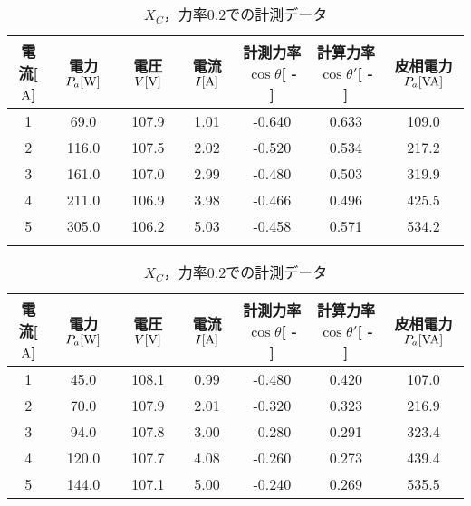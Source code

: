 \begin{table}[h]
	\caption{$X_{C}$，力率$0.4$での計測データ}
	\label{tab:0.4data2}
\begin{tabular}{ccccccc}
	\hline
	電流[$\rm{A}$] & 電力$P_a[\rm{W}]$ & 電圧$V[\rm{V}]$ & 電流$I[\rm{A}]$ & 計測力率$\cos \theta$[ - ] & 計算力率$\cos \theta '$[ - ] & 皮相電力$P_a[\rm{VA}]$ \\ \hline
	1 & 69.0  & 107.9 & 1.01 & -0.640 & 0.633 & 109.0 \\
	2 & 116.0 & 107.5 & 2.02 & -0.520 & 0.534 & 217.2 \\
	3 & 161.0 & 107.0 & 2.99 & -0.480 & 0.503 & 319.9 \\
	4 & 211.0 & 106.9 & 3.98 & -0.466 & 0.496 & 425.5 \\
	5 & 305.0 & 106.2 & 5.03 & -0.458 & 0.571 & 534.2 \\ \hline\\
\end{tabular}
	\caption{$X_{C}$，力率$0.2$での計測データ}
	\label{tab:0.2data2}
\begin{tabular}{ccccccc}
\hline
電流[$\rm{A}$] & 電力$P_a[\rm{W}]$ & 電圧$V[\rm{V}]$ & 電流$I[\rm{A}]$ & 計測力率$\cos \theta$[ - ] & 計算力率$\cos \theta '$[ - ] & 皮相電力$P_a[\rm{VA}]$ \\ \hline
1 & 45.0  & 108.1 & 0.99 & -0.480 & 0.420 & 107.0 \\
2 & 70.0  & 107.9 & 2.01 & -0.320 & 0.323 & 216.9 \\
3 & 94.0  & 107.8 & 3.00 & -0.280 & 0.291 & 323.4 \\
4 & 120.0 & 107.7 & 4.08 & -0.260 & 0.273 & 439.4 \\
5 & 144.0 & 107.1 & 5.00 & -0.240 & 0.269 & 535.5 \\ \hline
\end{tabular}
\end{table}
